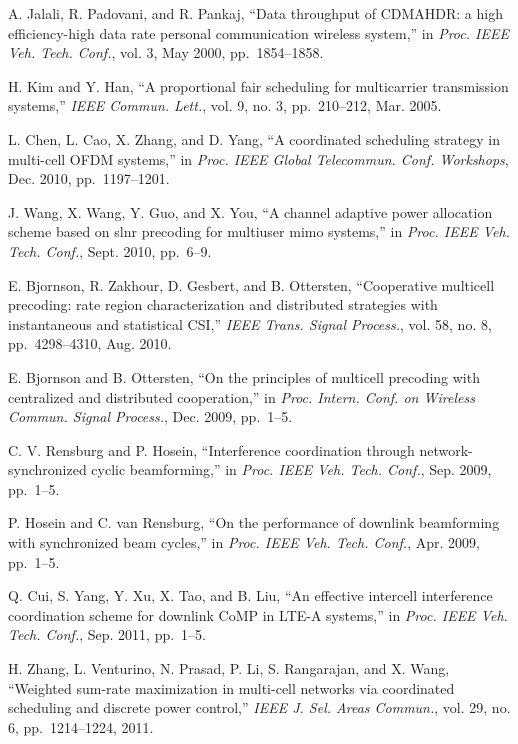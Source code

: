 \documentclass{ieeeaccess}
\begin{document}
\begin{thebibliography}{10}
  A. Jalali, R. Padovani, and R. Pankaj, ``Data throughput of CDMAHDR: a high efficiency-high data rate personal communication wireless
  system,'' in
  \emph{Proc. IEEE Veh. Tech. Conf.}, vol. 3, May 2000, pp.~1854--1858.
  
  H. Kim and Y. Han, ``A proportional fair scheduling for multicarrier transmission systems,''
  \emph{IEEE Commun. Lett.}, vol. 9, no. 3, pp.~210--212, Mar. 2005.
  
  L. Chen, L. Cao, X. Zhang, and D. Yang, ``A coordinated scheduling strategy in multi-cell OFDM systems,'' in
  \emph{Proc. IEEE Global Telecommun. Conf. Workshops}, Dec. 2010, pp.~1197--1201.
  
  J. Wang, X. Wang, Y. Guo, and X. You, ``A channel adaptive power allocation scheme based on slnr precoding for multiuser mimo systems,'' in
  \emph{Proc. IEEE Veh. Tech. Conf.}, Sept. 2010, pp.~6--9.
  
  E. Bjornson, R. Zakhour, D. Gesbert, and B. Ottersten, ``Cooperative multicell precoding: rate region characterization and distributed strategies with instantaneous and statistical CSI,''
  \emph{IEEE Trans. Signal Process.}, vol. 58, no. 8, pp.~4298--4310, Aug. 2010.
  
  E. Bjornson and B. Ottersten, ``On the principles of multicell precoding with centralized and distributed cooperation,'' in
  \emph{Proc. Intern. Conf. on Wireless Commun. Signal Process.}, Dec. 2009, pp.~1--5.
  
  C. V. Rensburg and P. Hosein, ``Interference coordination through network-synchronized cyclic beamforming,'' in
  \emph{Proc. IEEE Veh. Tech. Conf.}, Sep. 2009, pp.~1--5.
  
  P. Hosein and C. van Rensburg, ``On the performance of downlink beamforming with synchronized beam cycles,'' in
  \emph{Proc. IEEE Veh. Tech. Conf.}, Apr. 2009, pp.~1--5.
  
  Q. Cui, S. Yang, Y. Xu, X. Tao, and B. Liu, ``An effective intercell interference coordination scheme for downlink CoMP in LTE-A
  systems,'' in
  \emph{Proc. IEEE Veh. Tech. Conf.}, Sep. 2011, pp.~1--5.
  
  H. Zhang, L. Venturino, N. Prasad, P. Li, S. Rangarajan, and X. Wang, ``Weighted sum-rate maximization in multi-cell networks via coordinated scheduling and discrete power control,''
  \emph{IEEE J. Sel. Areas Commun.}, vol. 29, no. 6, pp.~1214--1224, 2011.
  

\end{thebibliography}
\end{document}
